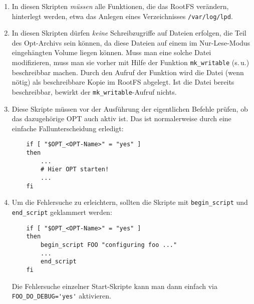 \begin{enumerate}
  \item In diesen Skripten \emph{müssen} alle Funktionen, die das RootFS
    verändern, hinterlegt werden, etwa das Anlegen eines
    Verzeichnisses \texttt{/var/log/lpd}.

  \item In diesen Skripten dürfen \emph{keine} Schreibzugriffe auf
    Dateien erfolgen, die Teil des Opt-Archivs sein können, da diese Dateien
    auf einem im Nur-Lese-Modus eingehängten Volume liegen können.
    Muss man eine solche Datei modifizieren, muss man sie
    vorher mit Hilfe der Funktion \texttt{mk\_writable} (s.\,u.) beschreibbar
    machen. Durch den Aufruf der Funktion wird die Datei (wenn nötig) als
    beschreibbare Kopie im RootFS abgelegt. Ist die Datei bereits beschreibbar,
    bewirkt der \texttt{mk\_writable}-Aufruf nichts.
    

  \item Diese Skripte müssen vor der Ausführung der eigentlichen
    Befehle prüfen, ob das dazugehörige OPT auch aktiv ist. Das ist
    normalerweise durch eine einfache Fallunterscheidung erledigt:

\begin{example}
\begin{verbatim}
    if [ "$OPT_<OPT-Name>" = "yes" ]
    then
        ...
        # Hier OPT starten!
        ...
    fi
\end{verbatim}
\end{example}

  \item Um die Fehlersuche zu erleichtern, sollten die Skripte mit
    \texttt{begin\_script} und \texttt{end\_script} geklammert werden:

\begin{example}
\begin{verbatim}
    if [ "$OPT_<OPT-Name>" = "yes" ]
    then
        begin_script FOO "configuring foo ..."
        ...
        end_script
    fi
\end{verbatim}
\end{example}

    Die Fehlersuche einzelner Start-Skripte kann man dann einfach via
    \verb+FOO_DO_DEBUG='yes'+ aktivieren.


\end{enumerate}

